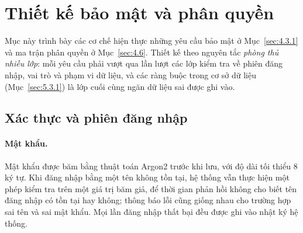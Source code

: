 \section{Thiết kế bảo mật và phân quyền}
\label{sec:5.5}

Mục này trình bày các cơ chế hiện thực những yêu cầu bảo mật ở Mục~\ref{sec:4.3.1} và ma trận phân quyền ở Mục~\ref{sec:4.6}. Thiết kế theo nguyên tắc \emph{phòng thủ nhiều lớp}: mỗi yêu cầu phải vượt qua lần lượt các lớp kiểm tra về phiên đăng nhập, vai trò và phạm vi dữ liệu, và các ràng buộc trong cơ sở dữ liệu (Mục~\ref{sec:5.3.1}) là lớp cuối cùng ngăn dữ liệu sai được ghi vào.

\subsection{Xác thực và phiên đăng nhập}
\label{sec:5.5.1}

\paragraph{Mật khẩu.} Mật khẩu được băm bằng thuật toán Argon2 trước khi lưu, với độ dài tối thiểu 8 ký tự. Khi đăng nhập bằng một tên không tồn tại, hệ thống vẫn thực hiện một phép kiểm tra trên một giá trị băm giả, để thời gian phản hồi không cho biết tên đăng nhập có tồn tại hay không; thông báo lỗi cũng giống nhau cho trường hợp sai tên và sai mật khẩu. Mọi lần đăng nhập thất bại đều được ghi vào nhật ký hệ thống.

